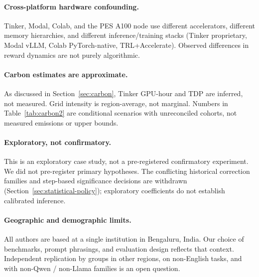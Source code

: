 \paragraph{Cross-platform hardware confounding.}
Tinker, Modal, Colab, and the PES A100 node use different accelerators,
different memory hierarchies, and different inference/training stacks
(Tinker proprietary, Modal vLLM, Colab PyTorch-native, TRL+Accelerate).
Observed differences in reward dynamics are not purely algorithmic.

\paragraph{Carbon estimates are approximate.}
As discussed in Section~\ref{sec:carbon}, Tinker GPU-hour and TDP are
inferred, not measured. Grid intensity is region-average, not marginal.
Numbers in Table~\ref{tab:carbon2} are conditional scenarios with
unreconciled cohorts, not measured emissions or upper bounds.

\paragraph{Exploratory, not confirmatory.}
This is an exploratory case study, not a pre-registered confirmatory
experiment. We did not pre-register primary hypotheses. The conflicting historical correction families and step-based significance
decisions are withdrawn (Section~\ref{sec:statistical-policy}); exploratory
coefficients do not establish calibrated inference.

\paragraph{Geographic and demographic limits.}
All authors are based at a single institution in Bengaluru, India. Our
choice of benchmarks, prompt phrasings, and evaluation design reflects
that context. Independent replication by groups in other regions, on
non-English tasks, and with non-Qwen / non-Llama families is an open
question.

